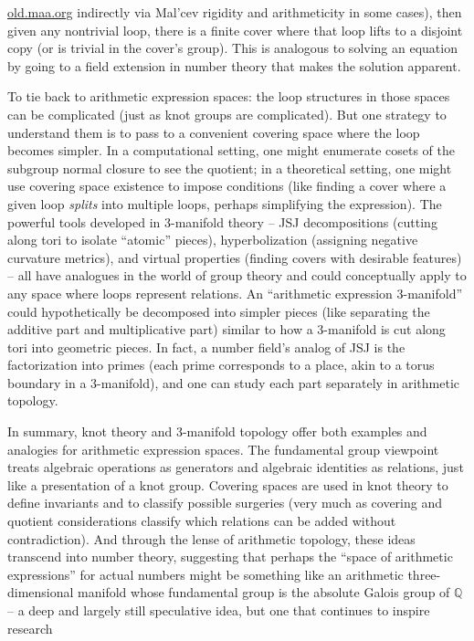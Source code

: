 \documentclass[11pt]{article}
\theoremstyle{remark}
\begin{document}
\href{https://old.maa.org/press/maa-reviews/knots-and-primes-an-introduction-to-arithmetic-topology#:~:text=All%20right%2C%20then%2C%20what%20does,manifolds%20and%20%E2%80%9Cnumber%20rings.%E2%80%9D}{old.maa.org}
 indirectly via Mal’cev rigidity and arithmeticity in some cases), then given any nontrivial loop, there is a finite cover where that loop lifts to a disjoint copy (or is trivial in the cover’s group). This is analogous to solving an equation by going to a field extension in number theory that makes the solution apparent.

To tie back to arithmetic expression spaces: the loop structures in those spaces can be complicated (just as knot groups are complicated). But one strategy to understand them is to pass to a convenient covering space where the loop becomes simpler. In a computational setting, one might enumerate cosets of the subgroup normal closure to see the quotient; in a theoretical setting, one might use covering space existence to impose conditions (like finding a cover where a given loop \textit{splits} into multiple loops, perhaps simplifying the expression). The powerful tools developed in 3-manifold theory – JSJ decompositions (cutting along tori to isolate “atomic” pieces), hyperbolization (assigning negative curvature metrics), and virtual properties (finding covers with desirable features) – all have analogues in the world of group theory and could conceptually apply to any space where loops represent relations. An “arithmetic expression 3-manifold” could hypothetically be decomposed into simpler pieces (like separating the additive part and multiplicative part) similar to how a 3-manifold is cut along tori into geometric pieces. In fact, a number field’s analog of JSJ is the factorization into primes (each prime corresponds to a place, akin to a torus boundary in a 3-manifold), and one can study each part separately in arithmetic topology.

In summary, knot theory and 3-manifold topology offer both examples and analogies for arithmetic expression spaces. The fundamental group viewpoint treats algebraic operations as generators and algebraic identities as relations, just like a presentation of a knot group. Covering spaces are used in knot theory to define invariants and to classify possible surgeries (very much as covering and quotient considerations classify which relations can be added without contradiction). And through the lense of arithmetic topology, these ideas transcend into number theory, suggesting that perhaps the “space of arithmetic expressions” for actual numbers might be something like an arithmetic three-dimensional manifold whose fundamental group is the absolute Galois group of $\mathbb{Q}$ – a deep and largely still speculative idea, but one that continues to inspire research
\end{document}

